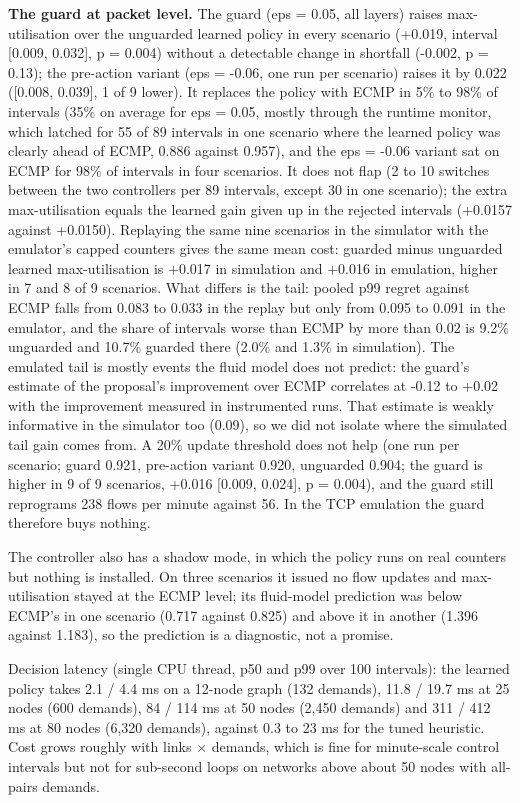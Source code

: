\documentclass[journal]{IEEEtran}
\begin{document}
\textbf{The guard at packet level.} The guard (eps = 0.05, all layers) raises max-utilisation over the unguarded learned policy in every scenario (+0.019, interval [0.009, 0.032], p = 0.004) without a detectable change in shortfall (-0.002, p = 0.13); the pre-action variant (eps = -0.06, one run per scenario) raises it by 0.022 ([0.008, 0.039], 1 of 9 lower). It replaces the policy with ECMP in 5\% to 98\% of intervals (35\% on average for eps = 0.05, mostly through the runtime monitor, which latched for 55 of 89 intervals in one scenario where the learned policy was clearly ahead of ECMP, 0.886 against 0.957), and the eps = -0.06 variant sat on ECMP for 98\% of intervals in four scenarios. It does not flap (2 to 10 switches between the two controllers per 89 intervals, except 30 in one scenario); the extra max-utilisation equals the learned gain given up in the rejected intervals (+0.0157 against +0.0150). Replaying the same nine scenarios in the simulator with the emulator's capped counters gives the same mean cost: guarded minus unguarded learned max-utilisation is +0.017 in simulation and +0.016 in emulation, higher in 7 and 8 of 9 scenarios. What differs is the tail: pooled p99 regret against ECMP falls from 0.083 to 0.033 in the replay but only from 0.095 to 0.091 in the emulator, and the share of intervals worse than ECMP by more than 0.02 is 9.2\% unguarded and 10.7\% guarded there (2.0\% and 1.3\% in simulation). The emulated tail is mostly events the fluid model does not predict: the guard's estimate of the proposal's improvement over ECMP correlates at -0.12 to +0.02 with the improvement measured in instrumented runs. That estimate is weakly informative in the simulator too (0.09), so we did not isolate where the simulated tail gain comes from. A 20\% update threshold does not help (one run per scenario; guard 0.921, pre-action variant 0.920, unguarded 0.904; the guard is higher in 9 of 9 scenarios, +0.016 [0.009, 0.024], p = 0.004), and the guard still reprograms 238 flows per minute against 56. In the TCP emulation the guard therefore buys nothing.

The controller also has a shadow mode, in which the policy runs on real counters but nothing is installed. On three scenarios it issued no flow updates and max-utilisation stayed at the ECMP level; its fluid-model prediction was below ECMP's in one scenario (0.717 against 0.825) and above it in another (1.396 against 1.183), so the prediction is a diagnostic, not a promise.

Decision latency (single CPU thread, p50 and p99 over 100 intervals): the learned policy takes 2.1 / 4.4 ms on a 12-node graph (132 demands), 11.8 / 19.7 ms at 25 nodes (600 demands), 84 / 114 ms at 50 nodes (2,450 demands) and 311 / 412 ms at 80 nodes (6,320 demands), against 0.3 to 23 ms for the tuned heuristic. Cost grows roughly with links $\times$ demands, which is fine for minute-scale control intervals but not for sub-second loops on networks above about 50 nodes with all-pairs demands.
\end{document}
